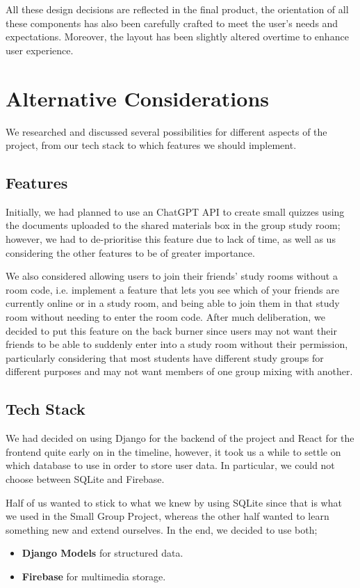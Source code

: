 All these design decisions are reflected in the final product, the orientation of all these components has also been carefully crafted to meet the user's needs and expectations. Moreover, the layout has been slightly altered overtime to enhance user experience.



\section{Alternative Considerations}
\label{sect:alternative-considerations}
We researched and discussed several possibilities for different aspects of the project, from our tech stack to which features we should implement.

\subsection{Features}
Initially, we had planned to use an ChatGPT API to create small quizzes using the documents uploaded to the shared materials box in the group study room; however, we had to de-prioritise this feature due to lack of time, as well as us considering the other features to be of greater importance.

We also considered allowing users to join their friends' study rooms without a room code, i.e. implement a feature that lets you see which of your friends are currently online or in a study room, and being able to join them in that study room without needing to enter the room code. After much deliberation, we decided to put this feature on the back burner since users may not want their friends to be able to suddenly enter into a study room without their permission, particularly considering that most students have different study groups for different purposes and may not want members of one group mixing with another.


\subsection{Tech Stack}
We had decided on using Django for the backend of the project and React for the frontend quite early on in the timeline, however, it took us a while to settle on which database to use in order to store user data. In particular, we could not choose between SQLite and Firebase. 

Half of us wanted to stick to what we knew by using SQLite since that is what we used in the Small Group Project, whereas the other half wanted to learn something new and extend ourselves. In the end, we decided to use both; \begin{itemize}
    \item \textbf{Django Models} for structured data.
    \item \textbf{Firebase} for multimedia storage.
\end{itemize}

